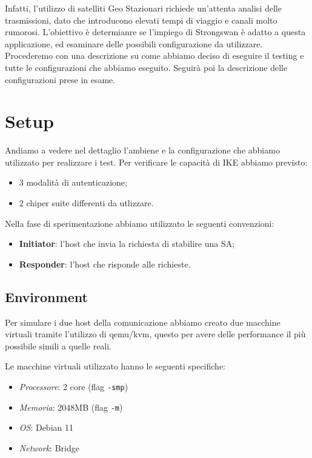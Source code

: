 \documentclass[
10pt, %
a4paper, %
oneside, %
headinclude,footinclude, %
BCOR5mm, %
]{scrartcl}
\begin{document}
\noindent
Infatti, l'utilizzo di satelliti Geo Stazionari richiede un'attenta analisi delle trasmissioni, dato che introducono elevati tempi di viaggio e canali molto rumorosi.
L'obiettivo è determianre se l'impiego di Strongswan è adatto a questa applicazione, ed esaminare delle possibili configurazione da utilizzare.
\\

\noindent
Procederemo con una descrizione su come abbiamo deciso di eseguire il testing e tutte le configurazioni che abbiamo eseguito.
Seguirà poi la descrizione delle configurazioni prese in esame.
\newpage
\section{Setup}

Andiamo a vedere nel dettaglio l'ambiene e la configurazione che abbiamo utilizzato per realizzare i test. Per verificare le capacità di IKE abbiamo previsto:
\begin{itemize}
    \item $3$ modalità di autenticazione;
    \item $2$ chiper suite differenti da utlizzare.
\end{itemize}

\noindent
Nella fase di sperimentazione abbiamo utilizzato le seguenti convenzioni:
\begin{itemize}
    \item \textbf{Initiator}: l'host che invia la richiesta di stabilire una SA;
    \item \textbf{Responder}: l'host che risponde alle richieste.
\end{itemize}


\subsection{Environment}

Per simulare i due host della comunicazione abbiamo creato due macchine virtuali tramite l'utilizzo di qemu/kvm, questo per avere 
delle performance il più possibile simili a quelle reali.

\noindent
Le macchine virtuali utilizzato hanno le seguenti specifiche:

\begin{itemize}
    \item \textit{Processore}: 2 core (flag \lstinline|-smp|)
    \item \textit{Memoria}: 2048MB (flag \lstinline|-m|)
    \item \textit{OS}: Debian 11
    \item \textit{Network}: Bridge
\end{itemize}
\end{document}
